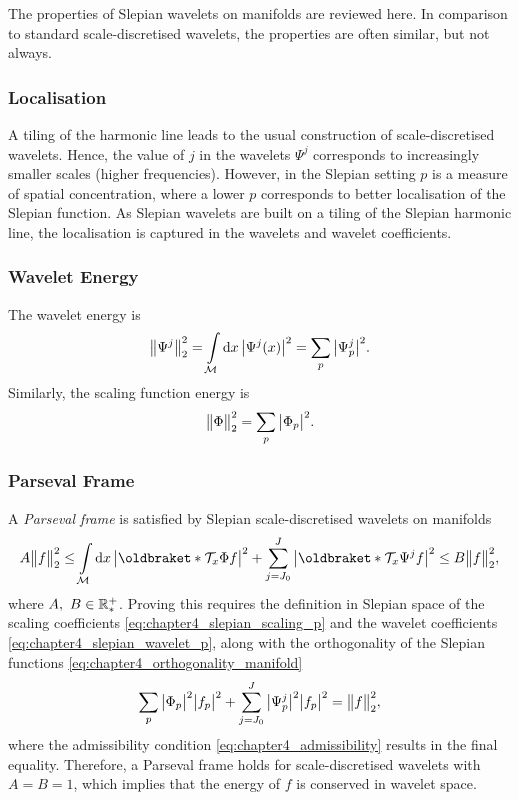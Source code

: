 The properties of Slepian wavelets on manifolds are reviewed here.
In comparison to standard scale-discretised wavelets, the properties are often similar, but not always.

\subsubsection{Localisation}\label{sec:chapter4_localisation}

A tiling of the harmonic line leads to the usual construction of scale-discretised wavelets.
Hence, the value of \(j\) in the wavelets \(\Psi^{j}\) corresponds to increasingly smaller scales (higher frequencies).
However, in the Slepian setting \(p\) is a measure of spatial concentration, where a lower \(p\) corresponds to better localisation of the Slepian function.
As Slepian wavelets are built on a tiling of the Slepian harmonic line, the localisation is captured in the wavelets and wavelet coefficients.

\subsubsection{Wavelet Energy}

The wavelet energy is
%
\begin{equation}
	{\big\lVert\Psi^{j}\big\rVert}_{2}^{2}
	= \int\limits_{\mathcal{M}} \dd{x} \big\lvert\Psi^{j}(x)\big\rvert^{2}
	= \sum\limits_{p} \big\lvert{\Psi}_{p}^{j}\big\rvert^{2}.
\end{equation}
%
Similarly, the scaling function energy is
%
\begin{equation}
	{\big\lVert\Phi\big\rVert}_{2}^{2}
	= \sum\limits_{p} \big\lvert{\Phi}_{p}\big\rvert^{2}.
\end{equation}

\subsubsection{Parseval Frame}

A \emph{Parseval frame} is satisfied by Slepian scale-discretised wavelets on manifolds
%
\begin{equation}
	A\norm{f}^{2} \leq \integrateManifold{x}
	\abs{\braket{\translation{x}\Phi}{f}}^{2}
	+ \waveletSum \abs{\braket{\translation{x}\Psi^{j}}{f}}^{2}
	\leq B\norm{f}^{2},
\end{equation}
%
where \(A,\ B \in \mathbb{R}_{\ast}^{+}{}\).
Proving this requires the definition in Slepian space of the scaling coefficients \cref{eq:chapter4_slepian_scaling_p} and the wavelet coefficients \cref{eq:chapter4_slepian_wavelet_p}, along with the orthogonality of the Slepian functions \cref{eq:chapter4_orthogonality_manifold}
%
\begin{equation}
	\sum\limits_{p} \big\lvert{\Phi}_{p}\big\rvert^{2} \big\lvert{f}_{p}\big\rvert^{2}
	+ \sum\limits_{j=J_{0}}^{J} \big\lvert{\Psi}_{p}^{j}\big\rvert^{2} \big\lvert{f}_{p}\big\rvert^{2}
	= {\big\lVert f\big\rVert}_{2}^{2},
\end{equation}
%
where the admissibility condition \cref{eq:chapter4_admissibility} results in the final equality.
Therefore, a Parseval frame holds for scale-discretised wavelets with \(A = B = 1\), which implies that the energy of \(f\) is conserved in wavelet space.

